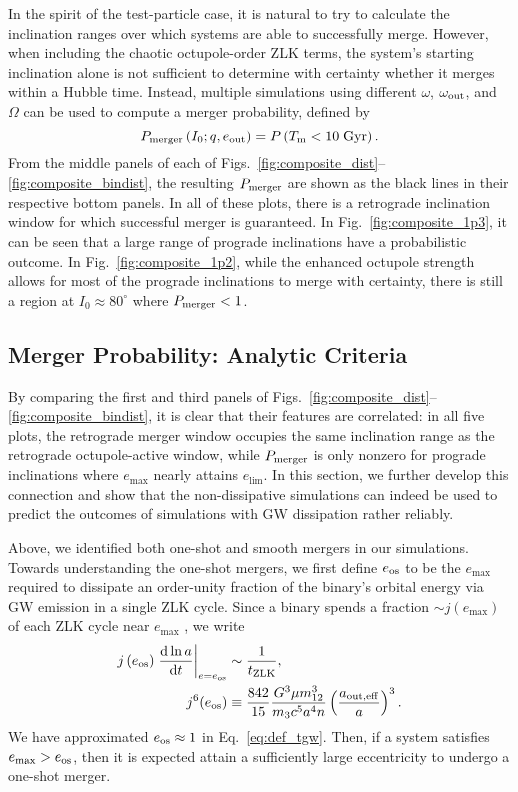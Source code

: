 \documentclass[
        fleqn,
        usenatbib,
    ]{mnras}
\newcommand*{\rd}[2]{\frac{\mathrm{d}#1}{\mathrm{d}#2}}
\newcommand*{\at}[1]{\left.#1\right|}
\newcommand*{\p}[1]{\left(#1\right)}
\begin{document}
In the spirit of the test-particle case, it is natural to try to calculate the
inclination ranges over which systems are able to successfully merge. However,
when including the chaotic octupole-order ZLK terms, the system's starting
inclination alone is not sufficient to determine with certainty whether it
merges within a Hubble time. Instead, multiple simulations using different
$\omega$, $\omega_{\rm out}$, and $\Omega$ can be used to compute a merger
probability, defined by
\begin{equation}
    P_{\rm merger}\p{I_0; q, e_{\rm out}} = P\p{T_{\rm m} < 10\;\mathrm{Gyr}}.
        \label{eq:def_pmerge}
\end{equation}
From the middle panels of each of
Figs.~\ref{fig:composite_dist}--\ref{fig:composite_bindist}, the resulting
$P_{\rm merger}$ are shown as the black lines in their respective bottom panels.
In all of these plots, there is a retrograde inclination window for which
successful merger is guaranteed. In Fig.~\ref{fig:composite_1p3}, it can be seen
that a large range of prograde inclinations have a probabilistic outcome. In
Fig.~\ref{fig:composite_1p2}, while the enhanced octupole strength allows for
most of the prograde inclinations to merge with certainty, there is still a
region at $I_0 \approx 80^\circ$ where $P_{\rm merger} < 1$.

\subsection{Merger Probability: Analytic Criteria}\label{ss:nogw_merger}

By comparing the first and third panels of
Figs.~\ref{fig:composite_dist}--\ref{fig:composite_bindist}, it is clear that
their features are correlated: in all five plots, the retrograde merger window
occupies the same inclination range as the retrograde octupole-active window,
while $P_{\rm merger}$ is only nonzero for prograde inclinations where
$e_{\max}$ nearly attains $e_{\lim}$. In this section, we further develop this
connection and show that the non-dissipative simulations can indeed be used to
predict the outcomes of simulations with GW dissipation rather reliably.

Above, we identified both one-shot and smooth mergers in our simulations.
Towards understanding the one-shot mergers, we first define $e_{\rm os}$ to be
the $e_{\max}$ required to dissipate an order-unity fraction of the binary's
orbital energy via GW emission in a single ZLK cycle. Since a binary spends a
fraction $\sim j(e_{\max})$ of each ZLK cycle near $e_{\max}$
\citep[e.g.,][]{anderson2016formation}, we write
\begin{align}
    j\p{e_{\rm os}}\at{\rd{\ln a}{t}}_{e = e_{\rm os}} &\sim
        \frac{1}{t_{\rm ZLK}},\\
    j^6(e_{\rm os})
        &\equiv \frac{842}{15}
            \frac{G^3 \mu m_{12}^3}{m_3c^5a^4n}
            \p{\frac{a_{\rm out, eff}}{a}}^3.
            \label{eq:def_e_os}
\end{align}
We have approximated $e_{\rm os} \approx 1$ in Eq.~\eqref{eq:def_tgw}. Then, if
a system satisfies $e_{\max} > e_{\rm os}$, then it is expected attain a
sufficiently large eccentricity to undergo a one-shot merger.
\end{document}
